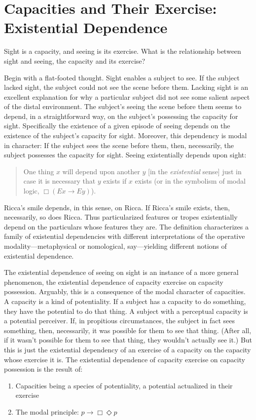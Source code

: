 \documentclass[12pt]{article}
\begin{document}


\section{Capacities and Their Exercise: Existential Dependence} %
\label{sec:capacities_and_their_exercise}

Sight is a capacity, and seeing is its exercise. What is the relationship between sight and seeing, the capacity and its exercise?

Begin with a flat-footed thought. Sight enables a subject to see. If the subject lacked sight, the subject could not see the scene before them. Lacking sight is an excellent explanation for why a particular subject did not see some salient aspect of the distal environment. The subject's seeing the scene before them seems to depend, in a straightforward way, on the subject's possessing the capacity for sight. Specifically the existence of a given episode of seeing depends on the existence of the subject's capacity for sight. Moreover, this dependency is modal in character: If the subject sees the scene before them, then, necessarily, the subject possesses the capacity for sight. Seeing existentially depends upon sight:
\begin{quote}
    One thing \( x \) will depend upon another \( y \) [in the \emph{existential} sense] just in case it is necessary that \( y \) exists if \( x \) exists (or in the symbolism of modal logic, \( \Box(Ex \rightarrow Ey) \)). \citep[270]{Fine:1995ls} 
\end{quote}
Ricca's smile depends, in this sense, on Ricca. If Ricca's smile exists, then, necessarily, so does Ricca. Thus particularized features or tropes existentially depend on the particulars whose features they are. The definition characterizes a family of existential dependencies with different interpretations of the operative modality---metaphysical or nomological, say---yielding different notions of existential dependence. 

The existential dependence of seeing on sight is an instance of a more general phenomenon, the existential dependence of capacity exercise on capacity possession. Arguably, this is a consequence of the modal character of capacities. A capacity is a kind of potentiality. If a subject has a capacity to do something, they have the potential to do that thing. A subject with a perceptual capacity is a potential perceiver. If, in propitious circumstances, the subject in fact sees something, then, necessarily, it was possible for them to see that thing. (After all, if it wasn't possible for them to see that thing, they wouldn't actually see it.) But this is just the existential dependency of an exercise of a capacity on the capacity whose exercise it is. The existential dependence of capacity exercise on capacity possession is the result of:
\begin{enumerate}[(1)]
    \item Capacities being a species of potentiality, a potential actualized in their exercise
    \item The modal principle: \( p \rightarrow \Box \Diamond p \)
\end{enumerate}
\end{document}
